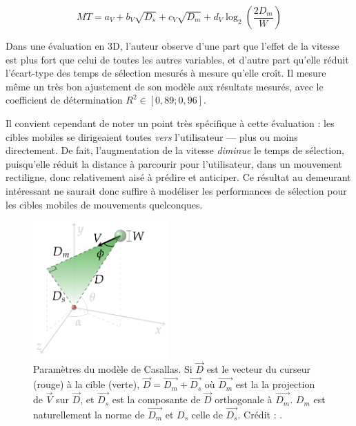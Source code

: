 	\begin{equation}
		\label{eq:casallas}
		MT = a_{V} + b_{V}\sqrt{D_{s}} +  c_{V}\sqrt{D_{m}} + d_{V} \log_{2} \left( \frac{2D_{m}}{W} \right)
	\end{equation}
	
	Dans une évaluation en 3D, l'auteur observe d'une part que l'effet de la vitesse est plus fort que celui de toutes les autres variables, et d'autre part qu'elle réduit l'écart-type des temps de sélection mesurés à mesure qu'elle croît. Il mesure même un très bon ajustement de son modèle aux résultats mesurés, avec le coefficient de détermination $R^{2} \in [0,89 ; 0,96]$.
	
	Il convient cependant de noter un point très spécifique à cette évaluation : les cibles mobiles se dirigeaient toutes \emph{vers} l'utilisateur --- plus ou moins directement. De fait, l'augmentation de la vitesse \emph{diminue} le temps de sélection, puisqu'elle réduit la distance à parcourir pour l'utilisateur, dans un mouvement rectiligne, donc relativement aisé à prédire et anticiper. Ce résultat au demeurant intéressant ne saurait donc suffire à modéliser les performances de sélection pour les cibles mobiles de mouvements quelconques.
	
	\begin{figure} %
		\centering
		\includegraphics[width=0.46\textwidth]{figures/ch2/casallas}
		\caption[Paramètres du modèle de Casallas]{Paramètres du modèle de Casallas. Si $\vec{D}$ est le vecteur du curseur (rouge) à la cible (verte), $\vec{D} = \vec{D_{m}} + \vec{D_{s}}$ où $\vec{D_{m}}$ est la la projection de $\vec{V}$ sur $\vec{D}$, et $\vec{D_{s}}$ est la composante de $\vec{D}$ orthogonale à $\vec{D_{m}}$. $D_{m}$ est naturellement la norme de $\vec{D_{m}}$ et $D_{s}$ celle de $\vec{D_{s}}$. Crédit : \cite{casallas2015prediction}.}
		\label{fig:casallas}
	\end{figure}
	
